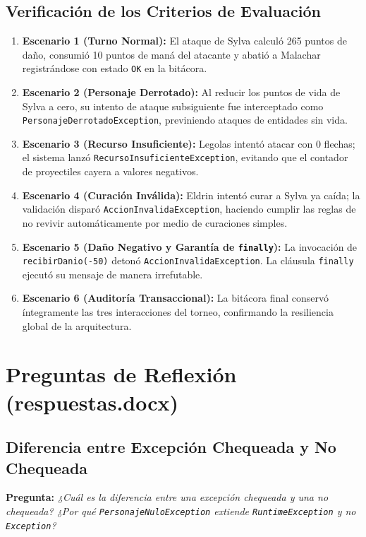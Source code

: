 \documentclass[11pt,letterpaper]{article}
\begin{document}
\subsection{Verificación de los Criterios de Evaluación}
\begin{enumerate}
    \item \textbf{Escenario 1 (Turno Normal):} El ataque de Sylva calculó 265 puntos de daño, consumió 10 puntos de maná del atacante y abatió a Malachar registrándose con estado \texttt{OK} en la bitácora.
    \item \textbf{Escenario 2 (Personaje Derrotado):} Al reducir los puntos de vida de Sylva a cero, su intento de ataque subsiguiente fue interceptado como \texttt{PersonajeDerrotadoException}, previniendo ataques de entidades sin vida.
    \item \textbf{Escenario 3 (Recurso Insuficiente):} Legolas intentó atacar con 0 flechas; el sistema lanzó \texttt{RecursoInsuficienteException}, evitando que el contador de proyectiles cayera a valores negativos.
    \item \textbf{Escenario 4 (Curación Inválida):} Eldrin intentó curar a Sylva ya caída; la validación disparó \texttt{AccionInvalidaException}, haciendo cumplir las reglas de no revivir automáticamente por medio de curaciones simples.
    \item \textbf{Escenario 5 (Daño Negativo y Garantía de \texttt{finally}):} La invocación de \texttt{recibirDanio(-50)} detonó \texttt{AccionInvalidaException}. La cláusula \texttt{finally} ejecutó su mensaje de manera irrefutable.
    \item \textbf{Escenario 6 (Auditoría Transaccional):} La bitácora final conservó íntegramente las tres interacciones del torneo, confirmando la resiliencia global de la arquitectura.
\end{enumerate}

\section{Preguntas de Reflexión (respuestas.docx)}

\subsection{Diferencia entre Excepción Chequeada y No Chequeada}
\textbf{Pregunta:} \textit{¿Cuál es la diferencia entre una excepción chequeada y una no chequeada? ¿Por qué \texttt{PersonajeNuloException} extiende \texttt{RuntimeException} y no \texttt{Exception}?}
\end{document}
